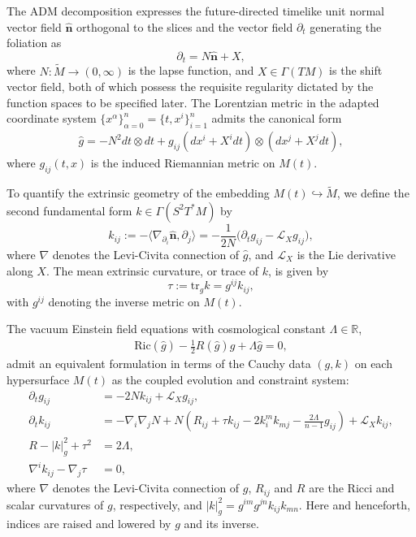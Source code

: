\documentclass{amsart}
\begin{document}
\noindent The ADM decomposition expresses the future-directed timelike unit normal vector field $\widehat{\mathbf{n}}$ orthogonal to the slices and the vector field $\partial_t$ generating the foliation as
\[
\partial_t = N \widehat{\mathbf{n}} + X,
\]
where $N: \widetilde{M} \to (0,\infty)$ is the lapse function, and $X \in \Gamma(T M)$ is the shift vector field, both of which possess the requisite regularity dictated by the function spaces to be specified later. The Lorentzian metric in the adapted coordinate system $\{x^\alpha\}_{\alpha=0}^n = \{t,x^i\}_{i=1}^n$ admits the canonical form
\begin{align}
\label{eq:spacetime_metric}
\widehat{g} = -N^2 dt \otimes dt + g_{ij} (dx^i + X^i dt) \otimes (dx^j + X^j dt),
\end{align}
where $g_{ij}(t,x)$ is the induced Riemannian metric on $M(t)$.

\noindent To quantify the extrinsic geometry of the embedding $M(t) \hookrightarrow \widetilde{M}$, we define the second fundamental form $k \in \Gamma(S^2 T^* M)$ by
\[
k_{ij} := -\langle \nabla_{\partial_i} \widehat{\mathbf{n}}, \partial_j \rangle = -\frac{1}{2N} \bigl(\partial_t g_{ij} - \mathscr{L}_X g_{ij}\bigr),
\]
where $\nabla$ denotes the Levi-Civita connection of $\widehat{g}$, and $\mathscr{L}_X$ is the Lie derivative along $X$. The mean extrinsic curvature, or trace of $k$, is given by
\[
\tau := \mathrm{tr}_g k = g^{ij} k_{ij},
\]
with $g^{ij}$ denoting the inverse metric on $M(t)$.

\noindent The vacuum Einstein field equations with cosmological constant $\Lambda \in \mathbb{R}$,
\begin{align}
\label{eq:einstein_equations}
\mathrm{Ric}(\widehat{g}) - \frac{1}{2} R(\widehat{g}) \widehat{g} + \Lambda \widehat{g} = 0,
\end{align}
admit an equivalent formulation in terms of the Cauchy data $(g,k)$ on each hypersurface $M(t)$ as the coupled evolution and constraint system:
\begin{align}
\label{eq:evol_g}
\partial_t g_{ij} &= -2N k_{ij} + \mathscr{L}_X g_{ij}, \\
\label{eq:evol_k}
\partial_t k_{ij} &= -\nabla_i \nabla_j N + N \left( R_{ij} + \tau k_{ij} - 2 k_i^m k_{mj} - \frac{2 \Lambda}{n-1} g_{ij} \right) + \mathscr{L}_X k_{ij}, \\
\label{eq:ham_constraint}
R - |k|_g^2 + \tau^2 &= 2\Lambda, \\
\label{eq:mom_constraint}
\nabla^i k_{ij} - \nabla_j \tau &= 0,
\end{align}
where $\nabla$ denotes the Levi-Civita connection of $g$, $R_{ij}$ and $R$ are the Ricci and scalar curvatures of $g$, respectively, and $|k|_g^2 = g^{im} g^{jn} k_{ij} k_{mn}$. Here and henceforth, indices are raised and lowered by $g$ and its inverse.
\end{document}
